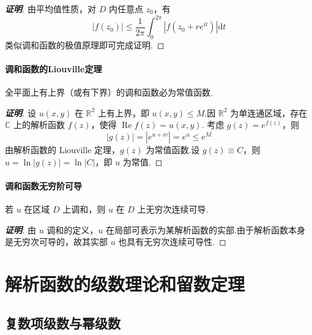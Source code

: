 \documentclass[openany,oneside]{ctexbook}
\begin{document}
\begin{proof}[\textbf{证明}]
由平均值性质，对 \( D \) 内任意点 \( z_0 \)，有
\[
|f(z_0)| \le \frac{1}{2\pi}\int_0^{2\pi}|f(z_0+re^{it})|\mathrm{d}t
\]
类似调和函数的极值原理即可完成证明.
\end{proof}
\subsubsection{调和函数的Liouville定理}
\begin{theorem}
全平面上有上界（或有下界）的调和函数必为常值函数.
\end{theorem}

\begin{proof}[\textbf{证明}]
设 \( u(x,y) \) 在 \( \mathbb{R}^2 \) 上有上界，即 \( u(x,y)\le M \).因 \( \mathbb{R}^2 \) 为单连通区域，存在 \( \mathbb{C} \) 上的解析函数 \( f(z) \)，使得 \( \operatorname{Re}f(z)=u(x,y) \).
考虑 \( g(z)=e^{f(z)} \)，则
\[
|g(z)|=|e^{u+iv}|=e^u\le e^M
\]
由解析函数的 Liouville 定理，\( g(z) \) 为常值函数.设 \( g(z)\equiv C \)，则 \( u=\ln|g(z)|=\ln|C| \)，即 \( u \) 为常值.
\end{proof}
\subsubsection{调和函数无穷阶可导}
\begin{theorem}
若 \( u \) 在区域 \( D \) 上调和，则 \( u \) 在 \( D \) 上无穷次连续可导.
\end{theorem}

\begin{proof}[\textbf{证明}]
由 \( u \) 调和的定义，\( u \) 在局部可表示为某解析函数的实部.由于解析函数本身是无穷次可导的，故其实部 \( u \) 也具有无穷次连续可导性.
\end{proof}
\chapter{解析函数的级数理论和留数定理}
\section{复数项级数与幂级数}
\end{document}
